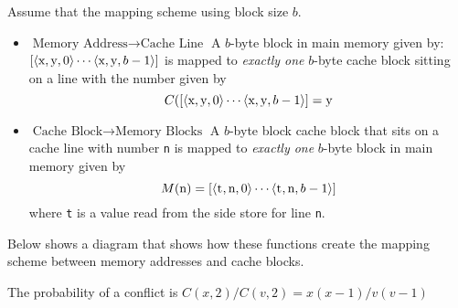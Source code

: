 Assume that the mapping scheme using block size $b$. 
\begin{itemize}	
\renewcommand{\labelitemi}{$\Box$}
\item \textbf{$\text{Memory Address} \rightarrow \text{Cache Line}$} 
A $b$-byte block in main memory given by:
$ [\langle \text{\lstinline{x}}, \text{\lstinline{y}}, 0 \rangle
\dotsm \langle \text{\lstinline{x}}, \text{\lstinline{y}}, b-1 \rangle]$
is mapped to \textit{exactly one} $b$-byte cache block sitting on a line with the 
number given by
$$C([\langle \text{\lstinline{x}}, \text{\lstinline{y}}, 0 \rangle
\dotsm \langle \text{\lstinline{x}}, \text{\lstinline{y}}, b-1 \rangle]
= \text{\lstinline{y}}$$

\item \textbf{$\text{Cache Block} \rightarrow \text{Memory Blocks}$} 
A $b$-byte block cache block that sits on a cache line with number \lstinline{n}
is mapped to \textit{exactly one} $b$-byte block in main memory given by 
$$M(\text{\lstinline{n}}) = [
\langle \text{\lstinline{t}}, \text{\lstinline{n}}, 0 \rangle
\dotsm
\langle \text{\lstinline{t}}, \text{\lstinline{n}}, b-1 \rangle]$$
where \lstinline{t} is a value read from the side store for line \lstinline{n}.
\end{itemize}


Below shows a diagram that shows how these functions create the 
mapping scheme between memory addresses and cache blocks. 



\begin{figure}[h]
\end{figure} 








The probability of a conflict is $C(x,2)/C(v,2) = x(x-1)/v(v-1)$



